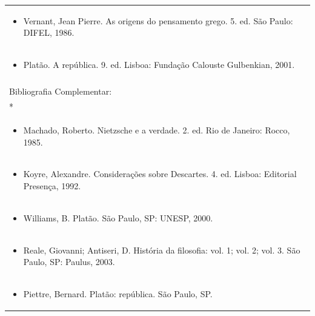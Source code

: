 \documentclass[11pt]{article}
\begin{document}
\begin{center}
\begin{longtable}{|p{4cm}|p{4cm}|p{4cm}|p{4cm}|}
\multicolumn{4}{|p{\dimexpr 16cm + 6\tabcolsep\relax}|}{\begin{itemize}\item Vernant, Jean Pierre. As origens do pensamento grego. 5. ed. São Paulo: DIFEL, 1986.\end{itemize}}\\
\multicolumn{4}{|p{\dimexpr 16cm + 6\tabcolsep\relax}|}{\begin{itemize}\item Platão. A república. 9. ed. Lisboa: Fundação Calouste Gulbenkian, 2001.\end{itemize}}\\
\multicolumn{4}{|p{16cm}|}{}\\
\hline
\multicolumn{4}{|p{16cm}|}{Bibliografia Complementar:}\\*
\multicolumn{4}{|p{\dimexpr 16cm + 6\tabcolsep\relax}|}{\begin{itemize}\item Ática, 1989.\end{itemize}}\\
\multicolumn{4}{|p{\dimexpr 16cm + 6\tabcolsep\relax}|}{\begin{itemize}\item Machado, Roberto. Nietzsche e a verdade. 2. ed. Rio de Janeiro: Rocco, 1985.\end{itemize}}\\
\multicolumn{4}{|p{\dimexpr 16cm + 6\tabcolsep\relax}|}{\begin{itemize}\item Koyre, Alexandre. Considerações sobre Descartes. 4. ed. Lisboa: Editorial Presença, 1992.\end{itemize}}\\
\multicolumn{4}{|p{\dimexpr 16cm + 6\tabcolsep\relax}|}{\begin{itemize}\item Williams, B. Platão. São Paulo, SP: UNESP, 2000.\end{itemize}}\\
\multicolumn{4}{|p{\dimexpr 16cm + 6\tabcolsep\relax}|}{\begin{itemize}\item Reale, Giovanni; Antiseri, D. História da filosofia: vol. 1; vol. 2; vol. 3. São Paulo, SP: Paulus, 2003.\end{itemize}}\\
\multicolumn{4}{|p{\dimexpr 16cm + 6\tabcolsep\relax}|}{\begin{itemize}\item Piettre, Bernard. Platão: república. São Paulo, SP.\end{itemize}}\\
\hline
\end{longtable}
\end{center}
\end{document}
